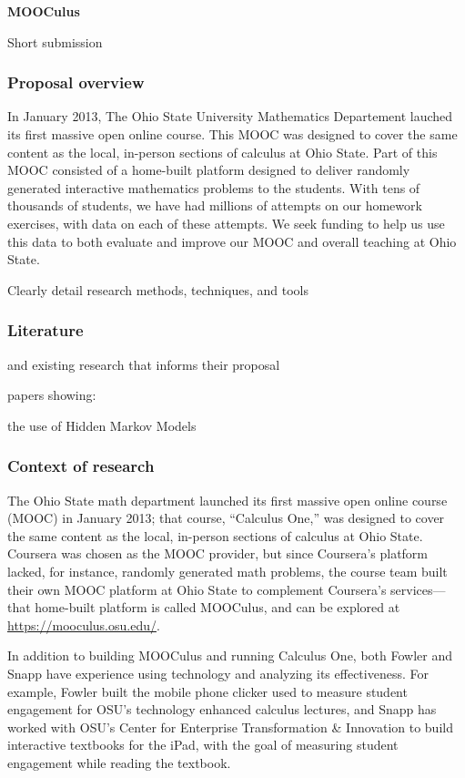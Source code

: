 \documentclass[12pt]{article}
\begin{document}
\begin{center}
  \textbf{MOOCulus}
\end{center}

Short submission

\subsubsection*{Proposal overview}

In January 2013, The Ohio State University Mathematics Departement
lauched its first massive open online course. This MOOC was designed
to cover the same content as the local, in-person sections of calculus
at Ohio State. Part of this MOOC consisted of a home-built platform
designed to deliver randomly generated interactive mathematics
problems to the students. With tens of thousands of students, we have
had millions of attempts on our homework exercises, with data on each
of these attempts. We seek funding to help us use this data to both
evaluate and improve our MOOC and overall teaching at Ohio State.





Clearly detail research methods, techniques, and tools

\subsubsection*{Literature}

and existing research
that informs their proposal
 
papers showing: 

the use of Hidden Markov Models


\subsubsection*{Context of research}

The Ohio State math department launched its first massive open online
course (MOOC) in January 2013; that course, ``Calculus One,'' was
designed to cover the same content as the local, in-person sections of
calculus at Ohio State.  Coursera was chosen as the MOOC provider, but
since Coursera's platform lacked, for instance, randomly generated
math problems, the course team built their own MOOC platform at Ohio
State to complement Coursera's services---that home-built platform is
called MOOCulus, and can be explored at
\url{https://mooculus.osu.edu/}.

In addition to building MOOCulus and running Calculus One, both Fowler
and Snapp have experience using technology and analyzing its
effectiveness.  For example, Fowler built the mobile phone clicker
used to measure student engagement for OSU's technology enhanced
calculus lectures, and Snapp has worked with OSU's Center for
Enterprise Transformation \& Innovation to build interactive textbooks
for the iPad, with the goal of measuring student engagement while
reading the textbook.
\end{document}
